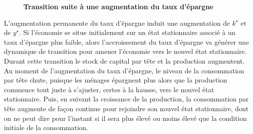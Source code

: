 \documentclass[10pt,a4paper,notitlepage]{report}
\begin{document}
\begin{wrapfigure}{r}{0.5\textwidth}
  \begin{center}
    
  \end{center}
  \vspace{-20pt}
  \caption{\textbf{Transition suite à une augmentation du taux d'épargne}}
  \vspace{-10pt}
\end{wrapfigure}
L'augmentation permanente du taux d'épargne induit une augmentation de
$k^{\star}$ et  de $y^{\star}$.   Si l'économie se  situe initialement
sur  un état  stationnaire associé  à un  taux d'épargne  plus faible,
alors l'accroissement  du taux d'épargne  va générer une  dynamique de
transition   pour    amener   l'économie    vers   le    nouvel   état
stationnaire. Durant cette transition le  stock de capital par tête et
la  production  augmentent.  Au   moment  de  l'augmentation  du  taux
d'épargne, le  niveau de la  consommation par tête chute,  puisque les
ménages épargnent plus  alors que la production commence  tout juste à
s'ajuster,  certes à  la  hausse, vers  le  nouvel état  stationnaire.
Puis, en suivant  la croissance de la production,  la consommation par
tête  augmente  de  façon  continue pour  rejoindre  son  nouvel  état
stationnaire, dont  on ne  peut dire  pour l'instant  si il  sera plus
élevé ou moins élevé que la condition initiale de la consommation.\newline
\end{document}

